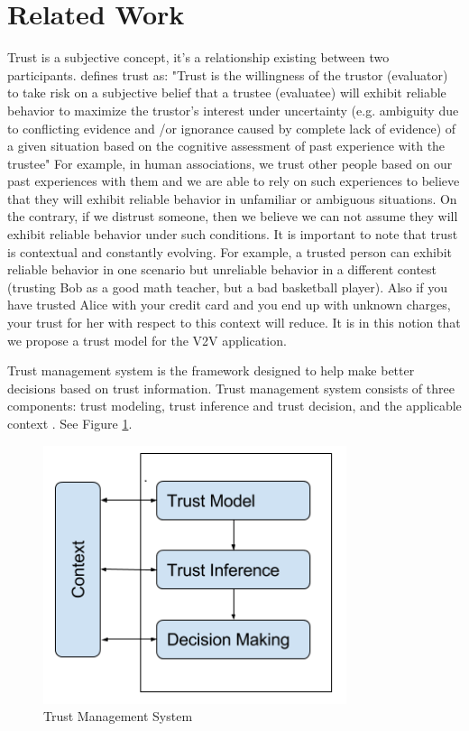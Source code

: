 \documentclass[conference]{IEEEtran}
\begin{document}
\section{Related Work} \label{lreview}
Trust is a subjective concept, it's a relationship existing between two participants. \cite{trustSurvey2015} defines trust as:
\newline
\newline
"Trust is the willingness of the trustor (evaluator) to take risk on a subjective belief that a trustee (evaluatee) will exhibit reliable behavior to maximize the trustor’s interest under uncertainty (e.g. ambiguity due to conflicting evidence and /or ignorance caused by complete lack of evidence) of a given situation based on the cognitive assessment of past experience with the trustee"
\newline
\newline
For example, in human associations, we trust other people based on our past experiences with them and we are able to rely on such experiences to believe that they will exhibit reliable behavior in unfamiliar or ambiguous situations. On the contrary, if we distrust someone, then we believe we can not assume they will exhibit reliable behavior under such conditions. It is important to note that trust is contextual and constantly evolving. For example, a trusted person can exhibit reliable behavior in one scenario but unreliable behavior in a different contest (trusting Bob as a good math teacher, but a bad basketball player). Also if you have trusted Alice with your credit card and you end up with unknown charges, your trust for her with respect to this context will reduce. It is in this notion that we propose a trust model for the V2V application.

Trust management system is the framework designed to help make better decisions based on trust information. Trust management system consists of three components: trust modeling, trust inference and trust decision, and the applicable context \cite{artIntel2005}. See Figure \ref{tmanagement}.

\begin{figure}[h]
\centering
\includegraphics[width=3.5in]{Trust_Management_System.png}
\caption{Trust Management System}
\label{tmanagement}
\end{figure}
\end{document}
